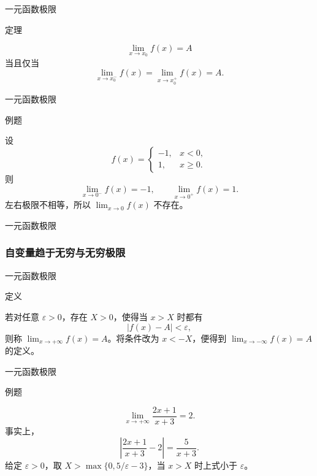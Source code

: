\documentclass[aspectratio=169,10pt,fontset=fandol]{ctexbeamer}
\begin{document}
\begin{frame}[t,fragile]{一元函数极限}
\normalsize
\begin{block}{定理}
{\normalsize

\[
\lim_{x\to x_0}f(x)=A
\]
当且仅当
\[
\lim_{x\to x_0^-}f(x)=\lim_{x\to x_0^+}f(x)=A.
\]

}
\end{block}
\end{frame}
\begin{frame}[t,fragile]{一元函数极限}
\normalsize
\begin{block}{例题}
{\normalsize

设
\[
f(x)=
\begin{cases}
-1,&x<0,\\
1,&x\geq0.
\end{cases}
\]
则
\[
\lim_{x\to0^-}f(x)=-1,\qquad
\lim_{x\to0^+}f(x)=1.
\]
左右极限不相等，所以 \(\lim_{x\to0}f(x)\) 不存在。

}
\end{block}
\end{frame}
\begin{frame}[t,fragile]{一元函数极限}
\normalsize
{\normalsize
\subsubsection*{自变量趋于无穷与无穷极限}


}
\end{frame}
\begin{frame}[t,fragile]{一元函数极限}
\normalsize
\begin{block}{定义}
{\normalsize

若对任意 \(\varepsilon>0\)，存在 \(X>0\)，使得当 \(x>X\) 时都有
\[
|f(x)-A|<\varepsilon,
\]
则称 \(\lim_{x\to+\infty}f(x)=A\)。将条件改为 \(x<-X\)，便得到 \(\lim_{x\to-\infty}f(x)=A\) 的定义。

}
\end{block}
\end{frame}
\begin{frame}[t,fragile]{一元函数极限}
\normalsize
\begin{block}{例题}
{\normalsize
\[
\lim_{x\to+\infty}\frac{2x+1}{x+3}=2.
\]
事实上，
\[
\left|\frac{2x+1}{x+3}-2\right|=\frac5{x+3}.
\]
给定 \(\varepsilon>0\)，取 \(X>\max\{0,5/\varepsilon-3\}\)，当 \(x>X\) 时上式小于 \(\varepsilon\)。

}
\end{block}
\end{frame}
\end{document}
